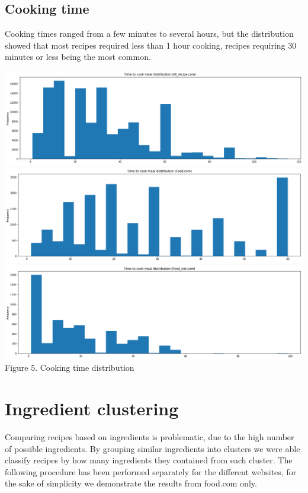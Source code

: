 \documentclass[11pt]{article}
\begin{document}
\subsection{Cooking time}

Cooking times ranged from a few minutes to several hours, but the distribution showed that most recipes required less than 1 hour cooking, recipes requiring 30 minutes or less being the most common.

\vspace{5mm}
\begin{center}
\includegraphics[scale=0.06]{cookingtime-1}
\includegraphics[scale=0.06]{cookingtime-2}
\includegraphics[scale=0.06]{cookingtime-3}
\label{cookingtime-dist} Figure 5. Cooking time distribution
\end{center}
\vspace{5mm}

\section{Ingredient clustering}

Comparing recipes based on ingredients is problematic, due to the high number of possible ingredients. By grouping similar ingredients into clusters we were able classify recipes by how many ingredients they contained from each cluster. The following procedure has been performed separately for the different websites, for the sake of simplicity we demonstrate the results from food.com only.
\end{document}
